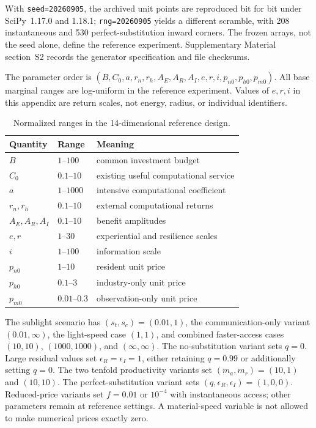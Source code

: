 With \texttt{seed=20260905}, the archived unit points are reproduced
bit for bit under SciPy~1.17.0 and 1.18.1;
\texttt{rng=20260905} yields a different scramble, with 208
instantaneous and 530 perfect-substitution inward corners.
The frozen arrays, not the seed alone, define the reference experiment.
Supplementary Material section~S2 records the generator specification
and file checksums.

The parameter order is $(B,C_0,a,r_n,r_h,A_E,A_R,A_I,e,r,i,p_{n0},p_{h0},p_{m0})$. All base marginal ranges are log-uniform in the reference experiment. Values of $e,r,i$ in this appendix are return scales, not energy, radius, or individual identifiers.

\begin{table}[htbp]
\centering
\caption{Normalized ranges in the 14-dimensional reference design.}
\label{tab:ranges}
\begin{tabular}{@{}lll@{}}
\toprule
Quantity & Range & Meaning\\
\midrule
$B$ & $1$--$100$ & common investment budget\\
$C_0$ & $0.1$--$10$ & existing useful computational service\\
$a$ & $1$--$1000$ & intensive computational coefficient\\
$r_n,r_h$ & $0.1$--$10$ & external computational returns\\
$A_E,A_R,A_I$ & $0.1$--$10$ & benefit amplitudes\\
$e,r$ & $1$--$30$ & experiential and resilience scales\\
$i$ & $1$--$100$ & information scale\\
$p_{n0}$ & $1$--$10$ & resident unit price\\
$p_{h0}$ & $0.1$--$3$ & industry-only unit price\\
$p_{m0}$ & $0.01$--$0.3$ & observation-only unit price\\
\bottomrule
\end{tabular}
\end{table}

The sublight scenario has $(s_t,s_c)=(0.01,1)$, the communication-only variant $(0.01,\infty)$, the light-speed case $(1,1)$, and combined faster-access cases $(10,10)$, $(1000,1000)$, and $(\infty,\infty)$. The no-substitution variant sets $q=0$. Large residual values set $\epsilon_R=\epsilon_I=1$, either retaining $q=0.99$ or additionally setting $q=0$. The two tenfold productivity variants set $(m_a,m_r)=(10,1)$ and $(10,10)$. The perfect-substitution variant sets $(q,\epsilon_R,\epsilon_I)=(1,0,0)$. Reduced-price variants set $f=0.01$ or $10^{-4}$ with instantaneous access; other parameters remain at reference settings. A material-speed variable is not allowed to make numerical prices exactly zero.

